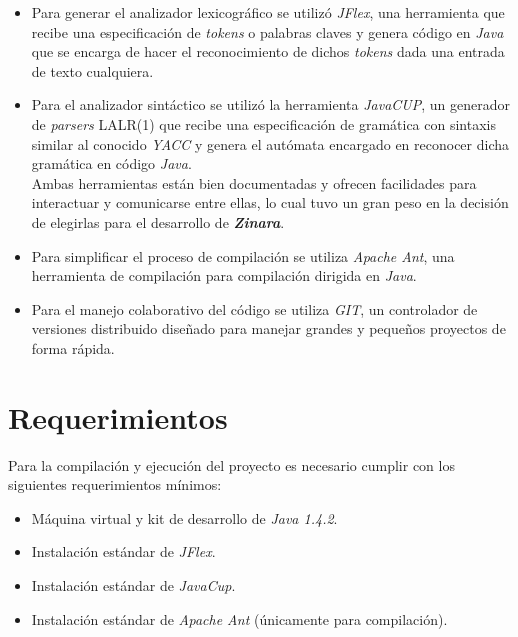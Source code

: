 \documentclass[12pt, spanish]{report}
\begin{document}
\begin{itemize}
\item Para generar el analizador lexicográfico se utilizó
  \emph{JFlex}\cite{jflex}, una herramienta que recibe una
  especificación de \emph{tokens} o palabras claves y genera código en
  \emph{Java} que se encarga de hacer el reconocimiento de dichos
  \emph{tokens} dada una entrada de texto cualquiera.

\item Para el analizador sintáctico se utilizó la herramienta
  \emph{JavaCUP}\cite{javacup}, un generador de \emph{parsers} LALR(1)
  que recibe una especificación de gramática con sintaxis similar al
  conocido \emph{YACC} y genera el autómata encargado en reconocer
  dicha gramática en código \emph{Java}.\\

  Ambas herramientas están bien documentadas y ofrecen facilidades
  para interactuar y comunicarse entre ellas, lo cual tuvo un gran
  peso en la decisión de elegirlas para el desarrollo de
  \emph{\textbf{Zinara}}.

\item Para simplificar el proceso de compilación se utiliza
  \emph{Apache Ant}\cite{ant}, una herramienta de compilación para
  compilación dirigida en \emph{Java}.

\item Para el manejo colaborativo del código se utiliza
  \emph{GIT}\cite{git}, un controlador de versiones distribuido
  diseñado para manejar grandes y pequeños proyectos de forma rápida.
\end{itemize}

\section{Requerimientos}
\label{sec:requ}

Para la compilación y ejecución del proyecto es necesario cumplir con
los siguientes requerimientos mínimos:

\begin{itemize}
\item Máquina virtual y kit de desarrollo de \emph{Java 1.4.2}.
\item Instalación estándar de \emph{JFlex}.
\item Instalación estándar de \emph{JavaCup}.
\item Instalación estándar de \emph{Apache Ant} (únicamente para
  compilación).
\end{itemize}
\end{document}
